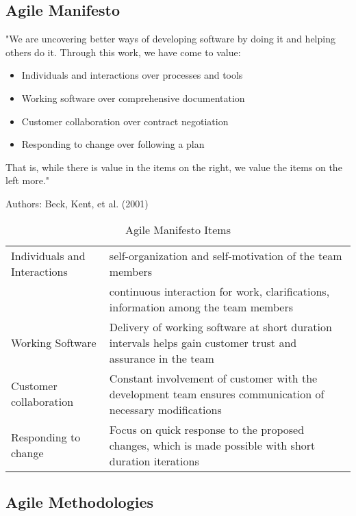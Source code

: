 \documentclass{article}
\begin{document}
\subsection{Agile Manifesto}
"We are uncovering better ways of developing software by doing it and helping
others do it. Through this work, we have come to value:

\begin{itemize}
  \item Individuals and interactions over processes and tools
  \item Working software over comprehensive documentation
  \item Customer collaboration over contract negotiation
  \item Responding to change over following a plan
\end{itemize}

That is, while there is value in the items on the right, we value the items on
the left more."

Authors: Beck, Kent, et al. (2001)

\begin{table}[H]
  \centering
  \begin{tabular}{l L}
    \hline
    \hline
    Individuals and Interactions &
    self-organization and self-motivation of the team members\\
    {} & continuous interaction for work, clarifications, information among the
         team members\\
    Working Software &
    Delivery of working software at short duration intervals helps gain customer
    trust and assurance in the team\\
    Customer collaboration &
    Constant involvement of customer with the development team ensures
    communication of necessary modifications\\
    Responding to change &
    Focus on quick response to the proposed changes, which is made possible with
    short duration iterations\\
    \hline
  \end{tabular}
  \caption{Agile Manifesto Items}
  \label{tab:parts}
\end{table}

\subsection{Agile Methodologies}
\end{document}
